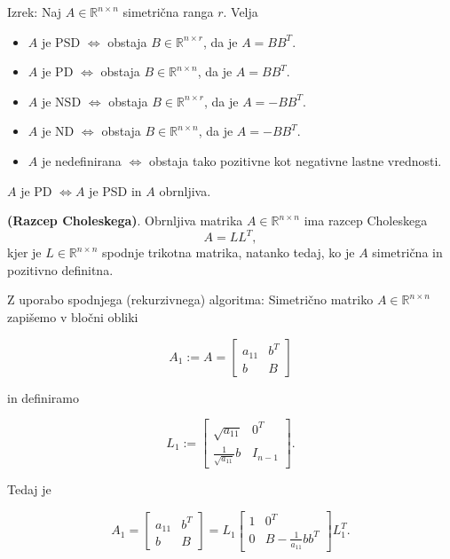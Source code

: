 \documentclass{article}
\begin{document}
\begin{multicols}{2}
	Izrek: Naj \( A \in \mathbb{R}^{n \times n} \) simetrična ranga \( r \). Velja
	\begin{itemize}
		\item \( A \) je PSD \( \Leftrightarrow \) obstaja \( B \in \mathbb{R}^{n \times r} \), da je \( A = BB^T \).
		\item \( A \) je PD \( \Leftrightarrow \) obstaja \( B \in \mathbb{R}^{n \times n} \), da je \( A = BB^T \).
		\item \( A \) je NSD \( \Leftrightarrow \) obstaja \( B \in \mathbb{R}^{n \times r} \), da je \( A = -BB^T \).
		\item \( A \) je ND \( \Leftrightarrow \) obstaja \( B \in \mathbb{R}^{n \times n} \), da je \( A = -BB^T \).
		\item \( A \) je nedefinirana \( \Leftrightarrow \) obstaja tako pozitivne kot negativne lastne vrednosti.
	\end{itemize}
	\( A \) je PD \( \Leftrightarrow A \) je PSD in \( A \) obrnljiva.

	\textbf{(Razcep Choleskega)}. Obrnljiva matrika \( A \in \mathbb{R}^{n \times n} \) ima razcep Choleskega
	\[ A = LL^T, \]
	kjer je \( L \in \mathbb{R}^{n \times n} \) spodnje trikotna matrika, natanko tedaj, ko je \( A \) simetrična in pozitivno definitna.

	Z uporabo spodnjega (rekurzivnega) algoritma:
	Simetrično matriko \( A \in \mathbb{R}^{n \times n} \) zapišemo v bločni obliki

	\[
		A_1 := A = \begin{bmatrix}
			a_{11} & b^T \\
			b      & B
		\end{bmatrix}
	\]

	in definiramo

	\[
		L_1 := \begin{bmatrix}
			\sqrt{a_{11}}             & 0^T     \\
			\frac{1}{\sqrt{a_{11}}} b & I_{n-1}
		\end{bmatrix}.
	\]

	Tedaj je

	\[
		A_1 = \begin{bmatrix}
			a_{11} & b^T \\
			b      & B
		\end{bmatrix} = L_1 \begin{bmatrix}
			1 & 0^T                       \\
			0 & B - \frac{1}{a_{11}} bb^T
		\end{bmatrix} L_1^T.
	\]


\end{multicols}
\end{document}

